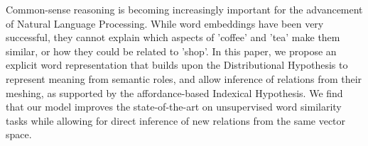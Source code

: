 Common-sense reasoning is becoming increasingly important for the advancement of Natural Language Processing. While word embeddings have been very successful, they cannot explain which aspects of 'coffee' and 'tea' make them similar, or how they could be related to 'shop'. In this paper, we propose an explicit word representation that builds upon the Distributional Hypothesis to represent meaning from semantic roles, and allow inference of relations from their meshing, as supported by the affordance-based Indexical Hypothesis. We find that our model improves the state-of-the-art on unsupervised word similarity tasks while allowing for direct inference of new relations from the same vector space.

